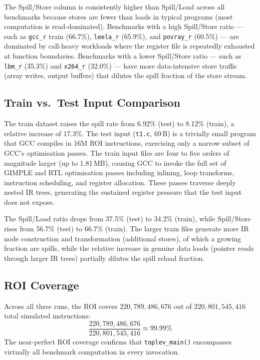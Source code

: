 \documentclass[conference]{IEEEtran}
\begin{document}
The Spill/Store column is consistently higher than Spill/Load across
all benchmarks because stores are fewer than loads in typical programs
(most computation is read-dominated). Benchmarks with a high
Spill/Store ratio --- such as \texttt{gcc\_r} train (66.7\%),
\texttt{leela\_r} (65.9\%), and \texttt{povray\_r} (60.5\%) ---
are dominated by call-heavy workloads where the register file is
repeatedly exhausted at function boundaries. Benchmarks with a
lower Spill/Store ratio --- such as \texttt{lbm\_r} (35.3\%) and
\texttt{x264\_r} (32.0\%) --- have more data-intensive store traffic
(array writes, output buffers) that dilutes the spill fraction of
the store stream.

\subsection{Train vs.\ Test Input Comparison}

The train dataset raises the spill rate from 6.92\% (test) to
8.12\% (train), a relative increase of 17.3\%. The test input
(\texttt{t1.c}, 69\,B) is a trivially small program that GCC
compiles in 16M ROI instructions, exercising only a narrow
subset of GCC's optimisation passes. The train input files are
four to five orders of magnitude larger (up to 1.81\,MB), causing
GCC to invoke the full set of GIMPLE and RTL optimisation passes
including inlining, loop transforms, instruction scheduling, and
register allocation. These passes traverse deeply nested IR trees,
generating the sustained register pressure that the test input
does not expose.

The Spill/Load ratio drops from 37.5\% (test) to 34.2\% (train),
while Spill/Store rises from 56.7\% (test) to 66.7\% (train).
The larger train files generate more IR node construction and
transformation (additional stores), of which a growing fraction
are spills, while the relative increase in genuine data loads
(pointer reads through larger IR trees) partially dilutes the
spill reload fraction.

\subsection{ROI Coverage}

Across all three runs, the ROI covers $220{,}789{,}486{,}676$ out
of $220{,}801{,}545{,}416$ total simulated instructions:
\[
\frac{220{,}789{,}486{,}676}{220{,}801{,}545{,}416} \approx 99.99\%
\]
The near-perfect ROI coverage confirms that \texttt{toplev\_main()}
encompasses virtually all benchmark computation in every invocation.
\end{document}
